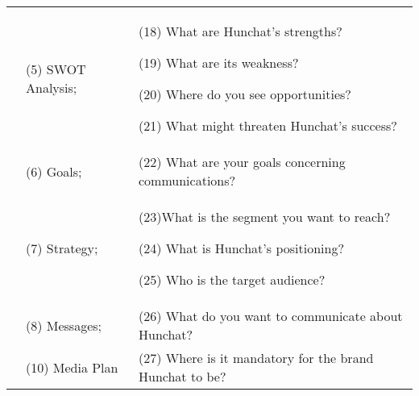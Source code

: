 \documentclass[12pt]{article}
\begin{document}
\begin{table}[htbp]
\begin{tabular}{ @{}P{0.15\textwidth}P{0.2\textwidth}P{0.6\textwidth}@{} }
                            & (5) SWOT Analysis;     & (18) What are Hunchat's strengths?   \par  (19) What are its weakness?  \par (20) Where do you see opportunities?   \par  (21) What might threaten Hunchat's success?                                                                                                                                                                                                                                 \\
                            & (6) Goals;             & (22) What are your goals concerning communications?                                                                                                                                                                                                                                                                                                                                                                              \\
                            & (7) Strategy;          & (23)What is the segment you want to reach? \par (24) What is Hunchat’s positioning?  \par  (25) Who is the target audience?                                                                                                                                                                                                                                                                      \\
                            & (8) Messages;          & (26) What do you want to communicate about Hunchat?                                                                                                                                                                                                                                                                                                                                                                              \\
                            & (10) Media Plan        & (27) Where is it mandatory for the brand Hunchat to be?                                                                                                                                                                                                                                                                                                                                                                          \\

\end{tabular}
\end{table}
\end{document}
